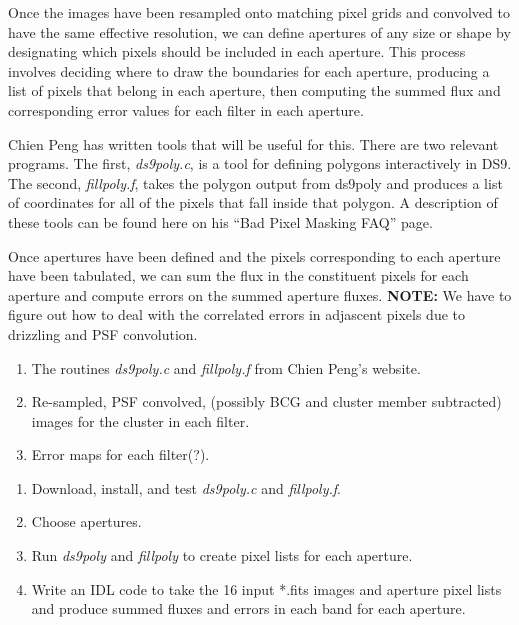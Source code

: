 \documentclass{emulateapj}
\begin{document}
Once the images have been resampled onto matching pixel grids and
convolved to have the same effective resolution, we can define
apertures of any size or shape by designating which pixels should be
included in each aperture.  This process involves deciding where to
draw the boundaries for each aperture, producing a list of pixels that
belong in each aperture, then computing the summed flux and
corresponding error values for each filter in each aperture.

Chien Peng has written tools that will be useful for this.  There are
two relevant programs.  The first, {\it{ds9poly.c}}, is a tool for
defining polygons interactively in DS9.  The second,
{\it{fillpoly.f}}, takes the polygon output from ds9poly and produces
a list of coordinates for all of the pixels that fall inside that
polygon.  A description of these tools can be found here on his ``Bad
Pixel Masking FAQ'' page. 

Once apertures have been defined and the pixels corresponding to each
aperture have been tabulated, we can sum the flux in the constituent
pixels for each aperture and compute errors on the summed aperture
fluxes.  {\bf{NOTE:}} We have to figure out how to deal with the
correlated errors in adjascent pixels due to drizzling and PSF
convolution.  

\vspace{0.08in}
\vspace{-0.1in}
\begin{enumerate}\itemsep-6pt
\item {The routines {\it{ds9poly.c}} and {\it{fillpoly.f}} from Chien
  Peng's website.}
\item {Re-sampled, PSF convolved, (possibly BCG and cluster member
  subtracted) images for the cluster in each filter.}
\item {Error maps for each filter(?).}
\end{enumerate}

\vspace{-0.1in}
\begin{enumerate}\itemsep-6pt
\item {Download, install, and test {\it{ds9poly.c}} and
  {\it{fillpoly.f}}.}
\item {Choose apertures.}
\item {Run {\it{ds9poly}} and {\it{fillpoly}} to create pixel lists
  for each aperture.}
\item {Write an IDL code to take the 16 input *.fits images and
  aperture pixel lists and produce summed fluxes and errors in each
  band for each aperture.}
\end{enumerate}
\end{document}
